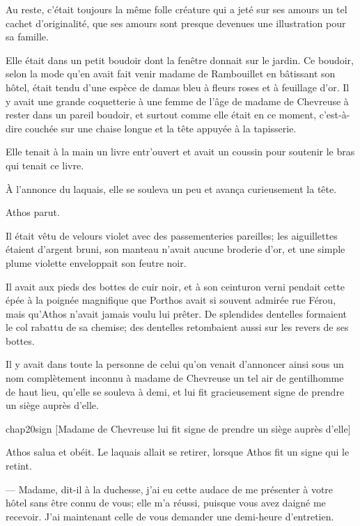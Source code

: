 Au reste, c'était toujours la même folle créature qui a jeté sur ses amours un tel cachet d'originalité, que ses amours sont presque devenues une illustration pour sa famille.

Elle était dans un petit boudoir dont la fenêtre donnait sur le jardin. Ce boudoir, selon la mode qu'en avait fait venir madame de Rambouillet en bâtissant son hôtel, était tendu d'une espèce de damas bleu à fleurs roses et à feuillage d'or. Il y avait une grande coquetterie à une femme de l'âge de madame de Chevreuse à rester dans un pareil boudoir, et surtout comme elle était en ce moment, c'est-à-dire couchée sur une chaise longue et la tête appuyée à la tapisserie.

Elle tenait à la main un livre entr'ouvert et avait un coussin pour soutenir le bras qui tenait ce livre.

À l'annonce du laquais, elle se souleva un peu et avança curieusement la tête.

Athos parut.

Il était vêtu de velours violet avec des passementeries pareilles; les aiguillettes étaient d'argent bruni, son manteau n'avait aucune broderie d'or, et une simple plume violette enveloppait son feutre noir.

Il avait aux pieds des bottes de cuir noir, et à son ceinturon verni pendait cette épée à la poignée magnifique que Porthos avait si souvent admirée rue Férou, mais qu'Athos n'avait jamais voulu lui prêter. De splendides dentelles formaient le col rabattu de sa chemise; des dentelles retombaient aussi sur les revers de ses bottes.

Il y avait dans toute la personne de celui qu'on venait d'annoncer ainsi sous un nom complètement inconnu à madame de Chevreuse un tel air de gentilhomme de haut lieu, qu'elle se souleva à demi, et lui fit gracieusement signe de prendre un siège auprès d'elle.

\begin{bwbigpic}
	[\basicscale] 
	{chap20sign}
	[Madame de Chevreuse lui fit signe de prendre un siège auprès d'elle]
\end{bwbigpic}


Athos salua et obéit. Le laquais allait se retirer, lorsque Athos fit un signe qui le retint.

— Madame, dit-il à la duchesse, j'ai eu cette audace de me présenter à votre hôtel sans être connu de vous; elle m'a réussi, puisque vous avez daigné me recevoir. J'ai maintenant celle de vous demander une demi-heure d'entretien.

